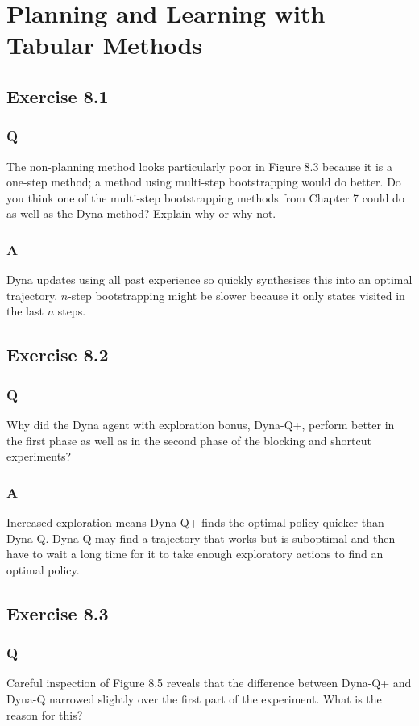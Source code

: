 \section{Planning and Learning with Tabular Methods}

\subsection{Exercise 8.1}
\subsubsection*{Q}
The non-planning method looks particularly poor in Figure 8.3 because it is a one-step method; a method using multi-step bootstrapping would do better. Do you think one of the multi-step bootstrapping methods from Chapter 7 could do as well as the Dyna method? Explain why or why not.
\subsubsection*{A}
Dyna updates using all past experience so quickly synthesises this into an optimal trajectory. $n$-step bootstrapping might be slower because it only states visited in the last $n$ steps.

\subsection{Exercise 8.2}
\subsubsection*{Q}
Why did the Dyna agent with exploration bonus, Dyna-Q+, perform better in the first phase as well as in the second phase of the blocking and shortcut experiments?
\subsubsection*{A}
Increased exploration means Dyna-Q+ finds the optimal policy quicker than Dyna-Q. Dyna-Q may find a trajectory that works but is suboptimal and then have to wait a long time for it to take enough exploratory actions to find an optimal policy.

\subsection{Exercise 8.3}
\subsubsection*{Q}
Careful inspection of Figure 8.5 reveals that the difference between Dyna-Q+ and Dyna-Q narrowed slightly over the first part of the experiment. What is the reason for this?

